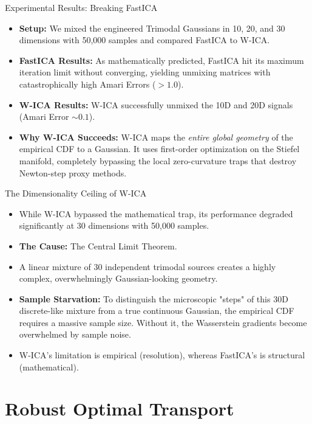\documentclass{beamer}
\begin{document}
\begin{frame}{Experimental Results: Breaking FastICA}
  \begin{itemize}
    \item \textbf{Setup:} We mixed the engineered Trimodal Gaussians in 10, 20, and 30 dimensions with 50,000 samples and compared FastICA to W-ICA.
    \item \textbf{FastICA Results:} As mathematically predicted, FastICA hit its maximum iteration limit without converging, yielding unmixing matrices with catastrophically high Amari Errors ($>1.0$).
    \item \textbf{W-ICA Results:} W-ICA successfully unmixed the 10D and 20D signals (Amari Error $\sim 0.1$). 
    \item \textbf{Why W-ICA Succeeds:} W-ICA maps the \textit{entire global geometry} of the empirical CDF to a Gaussian. It uses first-order optimization on the Stiefel manifold, completely bypassing the local zero-curvature traps that destroy Newton-step proxy methods.
  \end{itemize}
\end{frame}

\begin{frame}{The Dimensionality Ceiling of W-ICA}
  \begin{itemize}
    \item While W-ICA bypassed the mathematical trap, its performance degraded significantly at 30 dimensions with 50,000 samples.
    \item \textbf{The Cause:} The Central Limit Theorem.
    \item A linear mixture of 30 independent trimodal sources creates a highly complex, overwhelmingly Gaussian-looking geometry.
    \item \textbf{Sample Starvation:} To distinguish the microscopic "steps" of this 30D discrete-like mixture from a true continuous Gaussian, the empirical CDF requires a massive sample size. Without it, the Wasserstein gradients become overwhelmed by sample noise.
    \item W-ICA's limitation is empirical (resolution), whereas FastICA's is structural (mathematical).
  \end{itemize}
\end{frame}


\section{Robust Optimal Transport}
\end{document}
